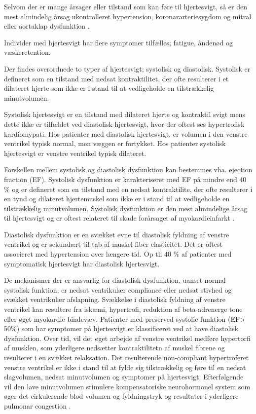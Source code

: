 Selvom der er mange årsager eller tilstand som kan føre til hjertesvigt, så er den mest almindelig årsag ukontrolleret hypertension, koronararteriesygdom og mitral eller aortaklap dysfunktion \citep{Fletcher2001}.

Individer med hjertesvigt har flere symptomer tilfælles; fatigue, åndenød og væskeretention. 

Der findes overordnede to typer af hjertesvigt; systolisk og diastolisk. Systolisk er defineret som en tilstand med nedsat kontraktilitet, der ofte resulterer i et dilateret hjerte  som ikke er i stand til at vedligeholde en tilstrækkelig minutvolumen. 

Systolisk hjertesvigt er en tilstand med dilateret hjerte og kontraktil svigt mens dette ikke er tilfældet ved diastolisk hjertesvigt, hvor der oftest ses hypertrofisk kardiomypati. \citep{Mudd2008}
Hos patienter med diastolisk hjertesvigt, er volumen i den venstre ventrikel typisk normal, men væggen er fortykket. Hos patienter systolisk hjertesvigt er venstre ventrikel typisk dilateret. \citep{Braunwald2013}

Forskellen mellem systolisk og diastolisk dysfunktion kan bestemmes vha. ejection fraction (EF). Systolisk dysfunktion er karakteriseret med EF på mindre end 40 \% og er defineret som en tilstand med en nedsat kontraktilite, der ofte resulterer i en tynd og dilateret hjertemuskel som ikke er i stand til at vedligeholde en tilstrækkelig minutvolumen. \citep{Consensus1999} \citep{Fletcher2001} Systolisk dysfunktion er den mest almindelige årsag til hjertesvigt og er oftest relateret til skade forårsaget af myokardieinfarkt \citep{Abraham1998} \citep{Fletcher2001}.

Diastolisk dysfunktion er en svækket evne til diastolisk fyldning af venstre ventrikel og er sekundært til tab af muskel fiber elasticitet. Det er oftest associeret med hypertension over længere tid. Op til 40 \% af patienter med symptomatisk hjertesvigt har diastolisk hjertesvigt. \citep{Willerson1995} \citep{Fletcher2001} 

De mekanismer der er ansvarlig for diastolisk dysfunktion, uanset normal systolisk funktion, er nedsat ventrikulær compliance eller nedsat stivhed og svækket ventrikulær afslapning. Svækkelse i diastolisk fyldning af venstre ventrikel kan resultere fra iskæmi, hypertrofi, reduktion af beta-adrenerge tone eller øget myokardie bindevæv. Patienter med preserved systolic funktion (EF> 50\%) som har symptomer på hjertesvigt er klassificeret ved at have diastolisk dysfunktion. \citep{Ruzumna1996} Over tid, vil det øget arbejde af venstre ventrikel medføre hypertorfi af musklen, som yderligere nedsætter kontraktilitetn af muskel fibrene og resulterer i en svækket relaksation. Det resulterende non-compliant hypertroferet venstre ventrikel er ikke i stand til at fylde sig tilstrækkelig og føre til en nedsat slagvolumen, nedsat minutvolumen og symptomer på hjertesvigt.  \citep{Ruzumna1996} Efterfølgende vil den lave minutvolumen stimulere kompensatoriske neurohormonel system som øger det cirkulerende blod volumen og fyldningstryk og resultater i yderligere pulmonar congestion \citep{Fletcher2001}.


